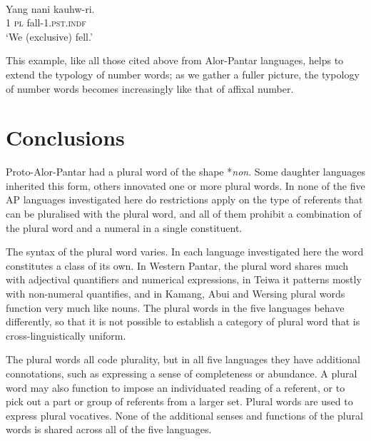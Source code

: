 \ea%
\label{ex:9:113}
 \\
\gll   Yang nani {kauhw-ri.}\\
  1 \textsc{pl} fall-1.\textsc{pst.indf}  \\
\glt `We (exclusive) fell.'
\z






This example, like all those cited above from Alor-Pantar languages, helps to extend the typology of number words; as we gather a fuller picture, the typology of number words becomes increasingly like that of affixal number.


\section{Conclusions} %
\label{sec:9:6}
Proto-Alor-Pantar had a plural word of the shape *\textit{non}. Some daughter languages inherited this form, others innovated one or more plural words. In none of the five AP languages investigated here do restrictions apply on the type of referents that can be pluralised with the plural word, and all of them prohibit a combination of the plural word and a numeral in a single constituent.

 The syntax of the plural word varies. In each language investigated here the word constitutes a class of its own. In Western Pantar, the plural word shares much with adjectival quantifiers and numerical expressions, in Teiwa it patterns mostly with non-numeral quantifies, and in Kamang, Abui and Wersing plural words function very much like nouns. The plural words in the five languages behave differently, so that it is not possible to establish a category of plural word that is cross-linguistically uniform.

 The plural words all code plurality, but in all five languages they have additional connotations, such as expressing a sense of completeness or abundance. A plural word may also function to impose an individuated reading of a referent, or to pick out a part or group of referents from a larger set. Plural words are used to express plural vocatives. None of the additional senses and functions of the plural words is shared across all of the five languages.

